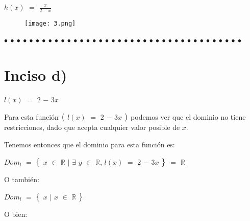 \documentclass[12pt]{article}
\newenvironment{MyColorPar}[1]{%
    \leavevmode\color{#1}\ignorespaces%
}{%
}%
\begin{document}
\begin{MyColorPar}{Lochinvar} \bfseries{
{}}  \vspace{0.5cm}
\end{MyColorPar}

  $h(x)$ $=$ {\LARGE{$\frac{x}{2-x}$}} \vspace{0.5cm}
  
  \begin{figure}[htb] \centering

    \texttt{[image: 3.png]} 

\end{figure}
 
 \begin{MyColorPar}{Saffron} \bfseries{
 $\bullet$ $\bullet$ $\bullet$ $\bullet$ $\bullet$ $\bullet$ $\bullet$ $\bullet$ $\bullet$ $\bullet$ $\bullet$ $\bullet$ $\bullet$ $\bullet$ $\bullet$ $\bullet$ $\bullet$ $\bullet$ $\bullet$ $\bullet$ $\bullet$ $\bullet$ $\bullet$ $\bullet$ $\bullet$ $\bullet$ $\bullet$ $\bullet$ $\bullet$ $\bullet$ $\bullet$ $\bullet$ $\bullet$ $\bullet$ $\bullet$ $\bullet$ $\bullet$ $\bullet$  }
\end{MyColorPar} \vspace{0.5cm}

\section*{{\textcolor{carrotorange}{\textsf{\bfseries{Inciso d)}}}}}

\begin{MyColorPar}{carrotorange} 
   $l(x)$ $=$ $2$ $-$ $3x$
    \end{MyColorPar} \vspace{0.5cm}

\begin{MyColorPar}{carrotorange} \bfseries{
{} 
Para esta función $\big{(}$  $l(x)$ $=$ $2$ $-$ $3x$ $\big{)}$ podemos ver que el dominio no tiene restricciones, dado que acepta cualquier valor posible de $x$. \vspace{0.5cm}

Tenemos entonces que el dominio para esta función es: \vspace{0.5cm}

\hspace{2cm} $Dom_{l}$ $=$ $\big{\{}$ $x$ $\in$ $\mathbb{R}$ $\mid$ $\exists$ $y$ $\in$ $\mathbb{R}$, $l(x)$ $=$ $2$ $-$ $3x$ $\big{\}}$ $=$ $\mathbb{R}$  \vspace{0.5cm}

O también: 

\hspace{2cm} $Dom_{l}$ $=$ $\big{\{}$ $x$ $\mid$  $x$ $\in$ $\mathbb{R}$  $\big{\}}$ \vspace{0.5cm}

O bien: 

\hspace{3cm}  \vspace{0.5cm}
}
\end{MyColorPar}
\end{document}
